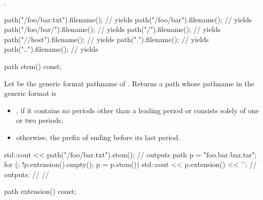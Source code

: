 \begin{itemdescr}
\pnum
\returns
{}.

\pnum
\begin{example}
\begin{codeblock}
path("/foo/bar.txt").filename();        // yields 
path("/foo/bar").filename();            // yields 
path("/foo/bar/").filename();           // yields 
path("/").filename();                   // yields 
path("//host").filename();              // yields 
path(".").filename();                   // yields 
path("..").filename();                  // yields 
\end{codeblock}
\end{example}
\end{itemdescr}

%
\begin{itemdecl}
path stem() const;
\end{itemdecl}

\begin{itemdescr}
\pnum
\returns
Let  be the generic format pathname of .
Returns a path whose pathname in the generic format is
\begin{itemize}
\item {}, if it contains no periods other than a leading period
or consists solely of one or two periods;
\item otherwise, the prefix of  ending before its last period.
\end{itemize}

\pnum
\begin{example}
\begin{codeblock}
std::cout << path("/foo/bar.txt").stem();       // outputs 
path p = "foo.bar.baz.tar";
for (; !p.extension().empty(); p = p.stem())
  std::cout << p.extension() << '\n';
  // outputs: 
  //          
  //          
\end{codeblock}
\end{example}
\end{itemdescr}

%
\begin{itemdecl}
path extension() const;
\end{itemdecl}

